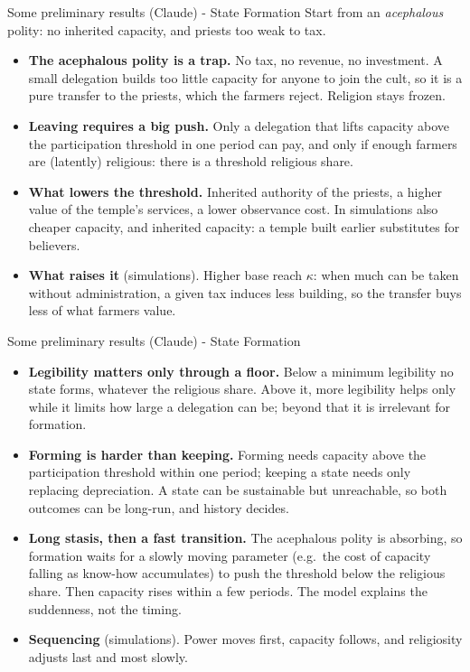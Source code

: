 \documentclass[11pt,aspectratio=169]{beamer}
\begin{document}
\begin{frame}{Some preliminary results (Claude) - State Formation}
Start from an \emph{acephalous} polity: no inherited capacity, and priests too weak to tax.
\begin{itemize}
\item \textbf{The acephalous polity is a trap.} No tax, no revenue, no investment. A small
delegation builds too little capacity for anyone to join the cult, so it is a pure transfer to the
priests, which the farmers reject. Religion stays frozen.
\item \textbf{Leaving requires a big push.} Only a delegation that lifts capacity above the
participation threshold in one period can pay, and only if enough farmers are (latently)
religious: there is a threshold religious share.
\item \textbf{What lowers the threshold.} Inherited authority of the priests, a higher value of the
temple's services, a lower observance cost. In simulations also cheaper capacity, and inherited
capacity: a temple built earlier substitutes for believers.
\item \textbf{What raises it} (simulations). Higher base reach $\kappa$: when much can be taken
without administration, a given tax induces less building, so the transfer buys less of what
farmers value.
\end{itemize}
\end{frame}

\begin{frame}{Some preliminary results (Claude) - State Formation}
\begin{itemize}
\item \textbf{Legibility matters only through a floor.} Below a minimum legibility no state forms,
whatever the religious share. Above it, more legibility helps only while it limits how large a
delegation can be; beyond that it is irrelevant for formation.
\item \textbf{Forming is harder than keeping.} Forming needs capacity above the participation
threshold within one period; keeping a state needs only replacing depreciation. A state can be
sustainable but unreachable, so both outcomes can be long-run, and history decides.
\item \textbf{Long stasis, then a fast transition.} The acephalous polity is absorbing, so formation
waits for a slowly moving parameter (e.g.\ the cost of capacity falling as know-how accumulates)
to push the threshold below the religious share. Then capacity rises within a few periods. The
model explains the suddenness, not the timing.
\item \textbf{Sequencing} (simulations). Power moves first, capacity follows, and religiosity
adjusts last and most slowly.
\end{itemize}
\end{frame}
\end{document}
